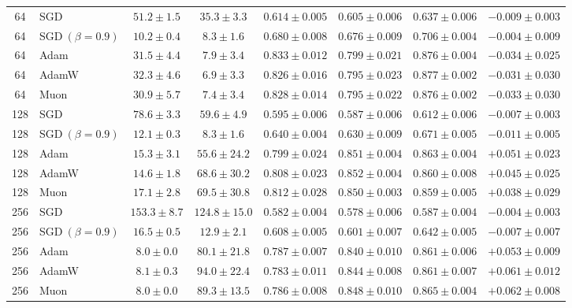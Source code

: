 \documentclass{article}
\begin{document}
\begin{table}[h]
{\begin{tabular}{cl|cc|ccc|c}
\midrule
64 & SGD & $51.2 \pm 1.5$ & $35.3 \pm 3.3$ & $0.614 \pm 0.005$ & $0.605 \pm 0.006$ & $0.637 \pm 0.006$ & $-0.009 \pm 0.003$ \\
64 & SGD$~(\beta = 0.9)$ & $10.2 \pm 0.4$ & $8.3 \pm 1.6$ & $0.680 \pm 0.008$ & $0.676 \pm 0.009$ & $0.706 \pm 0.004$ & $-0.004 \pm 0.009$ \\
64 & Adam & $31.5 \pm 4.4$ & $7.9 \pm 3.4$ & $0.833 \pm 0.012$ & $0.799 \pm 0.021$ & $0.876 \pm 0.004$ & $-0.034 \pm 0.025$ \\
64 & AdamW & $32.3 \pm 4.6$ & $6.9 \pm 3.3$ & $0.826 \pm 0.016$ & $0.795 \pm 0.023$ & $0.877 \pm 0.002$ & $-0.031 \pm 0.030$ \\
64 & Muon & $30.9 \pm 5.7$ & $7.4 \pm 3.4$ & $0.828 \pm 0.014$ & $0.795 \pm 0.022$ & $0.876 \pm 0.002$ & $-0.033 \pm 0.030$ \\
\midrule
128 & SGD & $78.6 \pm 3.3$ & $59.6 \pm 4.9$ & $0.595 \pm 0.006$ & $0.587 \pm 0.006$ & $0.612 \pm 0.006$ & $-0.007 \pm 0.003$ \\
128 & SGD$~(\beta = 0.9)$ & $12.1 \pm 0.3$ & $8.3 \pm 1.6$ & $0.640 \pm 0.004$ & $0.630 \pm 0.009$ & $0.671 \pm 0.005$ & $-0.011 \pm 0.005$ \\
128 & Adam & $15.3 \pm 3.1$ & $55.6 \pm 24.2$ & $0.799 \pm 0.024$ & $0.851 \pm 0.004$ & $0.863 \pm 0.004$ & $+0.051 \pm 0.023$ \\
128 & AdamW & $14.6 \pm 1.8$ & $68.6 \pm 30.2$ & $0.808 \pm 0.023$ & $0.852 \pm 0.004$ & $0.860 \pm 0.008$ & $+0.045 \pm 0.025$ \\
128 & Muon & $17.1 \pm 2.8$ & $69.5 \pm 30.8$ & $0.812 \pm 0.028$ & $0.850 \pm 0.003$ & $0.859 \pm 0.005$ & $+0.038 \pm 0.029$ \\
\midrule
256 & SGD & $153.3 \pm 8.7$ & $124.8 \pm 15.0$ & $0.582 \pm 0.004$ & $0.578 \pm 0.006$ & $0.587 \pm 0.004$ & $-0.004 \pm 0.003$ \\
256 & SGD$~(\beta = 0.9)$ & $16.5 \pm 0.5$ & $12.9 \pm 2.1$ & $0.608 \pm 0.005$ & $0.601 \pm 0.007$ & $0.642 \pm 0.005$ & $-0.007 \pm 0.007$ \\
256 & Adam & $8.0 \pm 0.0$ & $80.1 \pm 21.8$ & $0.787 \pm 0.007$ & $0.840 \pm 0.010$ & $0.861 \pm 0.006$ & $+0.053 \pm 0.009$ \\
256 & AdamW & $8.1 \pm 0.3$ & $94.0 \pm 22.4$ & $0.783 \pm 0.011$ & $0.844 \pm 0.008$ & $0.861 \pm 0.007$ & $+0.061 \pm 0.012$ \\
256 & Muon & $8.0 \pm 0.0$ & $89.3 \pm 13.5$ & $0.786 \pm 0.008$ & $0.848 \pm 0.010$ & $0.865 \pm 0.004$ & $+0.062 \pm 0.008$ \\
\bottomrule
\end{tabular}}
\end{table}
\end{document}
